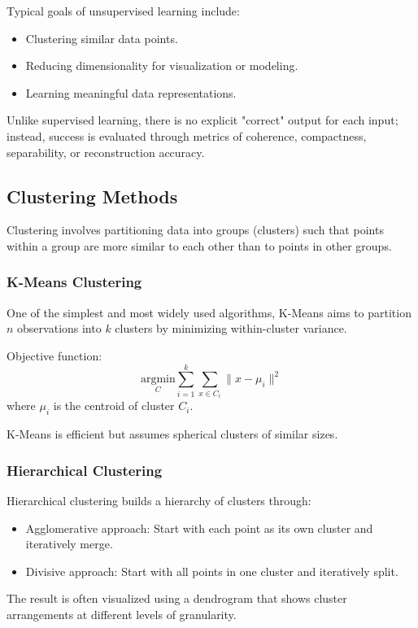 \documentclass[openany]{book}
\begin{document}
Typical goals of unsupervised learning include:
\begin{itemize}
    \item Clustering similar data points.
    \item Reducing dimensionality for visualization or modeling.
    \item Learning meaningful data representations.
\end{itemize}

Unlike supervised learning, there is no explicit "correct" output for each 
input; instead, success is evaluated through metrics of coherence, compactness, 
separability, or reconstruction accuracy.

\subsection{Clustering Methods}
Clustering involves partitioning data into groups (clusters) such that points 
within a group are more similar to each other than to points in other groups.

\subsubsection{K-Means Clustering}
One of the simplest and most widely used algorithms, K-Means aims to partition 
\( n \) observations into \( k \) clusters by minimizing within-cluster 
variance.

Objective function:
\[
\underset{C}{\text{argmin}} \sum_{i=1}^{k} \sum_{x \in C_i} \| x - \mu_i \|^2
\]
where \( \mu_i \) is the centroid of cluster \( C_i \).

K-Means is efficient but assumes spherical clusters of similar sizes.

\subsubsection{Hierarchical Clustering}
Hierarchical clustering builds a hierarchy of clusters through:
\begin{itemize}
    \item Agglomerative approach: Start with each point as its own cluster and 
    iteratively merge.
    \item Divisive approach: Start with all points in one cluster and 
    iteratively split.
\end{itemize}
The result is often visualized using a dendrogram that shows cluster 
arrangements at different levels of granularity.
\end{document}
